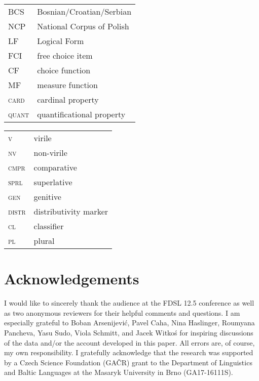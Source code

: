 \documentclass[output=paper, newtxmath, colorlinks, citecolor=brown]{langsci/langscibook}
\begin{document}
	\begin{tabularx}{.48\textwidth}{lQ}
		BCS&Bosnian/Croatian/Serbian\\
		NCP&National Corpus of Polish\\
		LF&Logical Form\\
		{FCI}&{free choice item}\\
		{CF}&{choice function}\\
		{MF}&{measure function}\\
		\textsc{card}&{cardinal} property\\
		\textsc{quant}&{quantificational property}\\
	\end{tabularx}
	\begin{tabularx}{.48\textwidth}{lQ}
		\textsc{v}&virile\\
		\textsc{nv}&non-virile\\
		\textsc{cmpr}&{comparative}\\
		\textsc{sprl}&{superlative}\\
		\textsc{gen}&genitive\\
		\textsc{distr}&{distributivity marker}\\
		\textsc{cl}&{classifier}\\
		\textsc{pl}&plural\\
	\end{tabularx}

	\section*{Acknowledgements}

	I would like to sincerely thank the audience at the FDSL 12.5 conference as well as two anonymous reviewers for their helpful comments and questions. I am especially grateful to Boban Arsenijević, Pavel Caha, Nina Haslinger, Roumyana Pancheva, Yasu Sudo, Viola Schmitt, and Jacek Witkoś for inspiring discussions of the data and/or the account developed in this paper. All errors are, of course, my own responsibility. I gratefully acknowledge that the research was supported by a Czech Science Foundation (GAČR) grant to the Department of Linguistics and Baltic Languages at the Masaryk University in Brno (GA17-16111S).

\sloppy
\printbibliography[heading=subbibliography,notkeyword=this]
\end{document}
